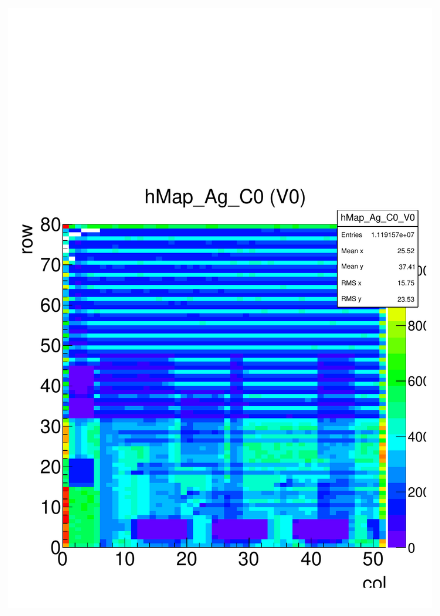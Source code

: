 \documentclass[a4paper,12pt,twoside]{article}
\begin{document}
\begin{figure} [h!]
\centering
\begin{minipage}{.48\textwidth}
  \centering
  \includegraphics[width=\textwidth]{./HRData_Hitmap.pdf}
  \label{HRData-Hitmap}
\end{minipage}%
\hspace{2mm}
\begin{minipage}{.48\textwidth}
  \centering

\end{minipage}
\end{figure}
\end{document}
